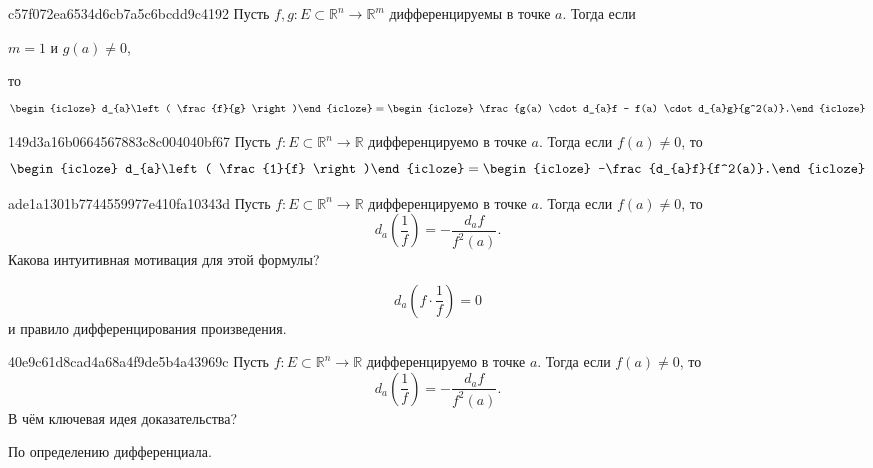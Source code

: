 \begin{note}{c57f072ea6534d6cb7a5c6bcdd9c4192}
    Пусть \({ f, g : E \subset \mathbb R^{n} \to \mathbb R^{m} }\) дифференцируемы в точке \({ a }\).
    Тогда если \begin{icloze}{3}\({ m = 1 }\) и \({ g(a) \neq 0 }\),\end{icloze} то
    \[
        \begin{icloze}{2}d_{a}\left( \frac{f}{g} \right)\end{icloze} = \begin{icloze}{1}\frac{g(a) \cdot d_{a}f - f(a) \cdot d_{a}g}{g^2(a)}.\end{icloze}
    \]
\end{note}

\begin{note}{149d3a16b0664567883c8c004040bf67}
    Пусть \({ f : E \subset \mathbb R^{n} \to \mathbb R }\) дифференцируемо в точке \({ a }\).
    Тогда если \({ f(a) \neq 0 }\), то
    \[
        \begin{icloze}{2}d_{a}\left( \frac{1}{f} \right)\end{icloze} = \begin{icloze}{1}-\frac{d_{a}f}{f^2(a)}.\end{icloze}
    \]
\end{note}

\begin{note}{ade1a1301b7744559977e410fa10343d}
    Пусть \({ f : E \subset \mathbb R^{n} \to \mathbb R }\) дифференцируемо в точке \({ a }\).
    Тогда если \({ f(a) \neq 0 }\), то
    \[
        d_{a}\left( \frac{1}{f} \right) = -\frac{d_{a}f}{f^2(a)}.
    \]
    Какова интуитивная мотивация для этой формулы?

    \begin{cloze}{1}
        \[
            d_{a} \left( f \cdot \frac{1}{f} \right) = 0
        \]
        и правило дифференцирования произведения.
    \end{cloze}
\end{note}

\begin{note}{40e9c61d8cad4a68a4f9de5b4a43969c}
    Пусть \({ f : E \subset \mathbb R^{n} \to \mathbb R }\) дифференцируемо в точке \({ a }\).
    Тогда если \({ f(a) \neq 0 }\), то
    \[
        d_{a}\left( \frac{1}{f} \right) = -\frac{d_{a}f}{f^2(a)}.
    \]
    В чём ключевая идея доказательства?

    \begin{cloze}{1}
        По определению дифференциала.
    \end{cloze}
\end{note}

